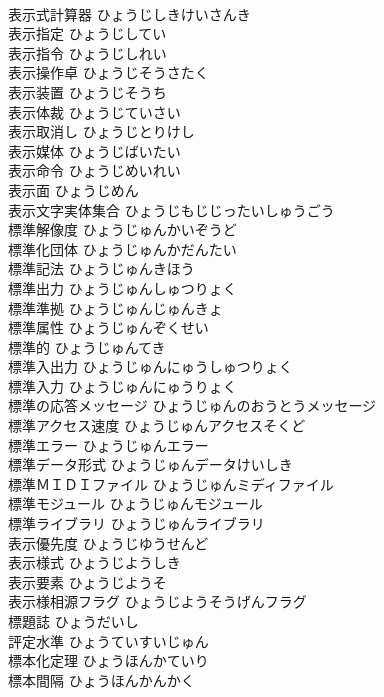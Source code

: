 \documentclass[8pt]{extreport}
\begin{document}
\begin{CJK}{UTF8}{min}
\\	表示式計算器	ひょうじしきけいさんき	
\\	表示指定	ひょうじしてい	
\\	表示指令	ひょうじしれい	
\\	表示操作卓	ひょうじそうさたく	
\\	表示装置	ひょうじそうち	
\\	表示体裁	ひょうじていさい	
\\	表示取消し	ひょうじとりけし	
\\	表示媒体	ひょうじばいたい	
\\	表示命令	ひょうじめいれい	
\\	表示面	ひょうじめん	
\\	表示文字実体集合	ひょうじもじじったいしゅうごう	
\\	標準解像度	ひょうじゅんかいぞうど	
\\	標準化団体	ひょうじゅんかだんたい	
\\	標準記法	ひょうじゅんきほう	
\\	標準出力	ひょうじゅんしゅつりょく	
\\	標準準拠	ひょうじゅんじゅんきょ	
\\	標準属性	ひょうじゅんぞくせい	
\\	標準的	ひょうじゅんてき	
\\	標準入出力	ひょうじゅんにゅうしゅつりょく	
\\	標準入力	ひょうじゅんにゅうりょく	
\\	標準の応答メッセージ	ひょうじゅんのおうとうメッセージ	
\\	標準アクセス速度	ひょうじゅんアクセスそくど	
\\	標準エラー	ひょうじゅんエラー	
\\	標準データ形式	ひょうじゅんデータけいしき	
\\	標準ＭＩＤＩファイル	ひょうじゅんミディファイル	
\\	標準モジュール	ひょうじゅんモジュール	
\\	標準ライブラリ	ひょうじゅんライブラリ	
\\	表示優先度	ひょうじゆうせんど	
\\	表示様式	ひょうじようしき	
\\	表示要素	ひょうじようそ	
\\	表示様相源フラグ	ひょうじようそうげんフラグ	
\\	標題誌	ひょうだいし	
\\	評定水準	ひょうていすいじゅん	
\\	標本化定理	ひょうほんかていり	
\\	標本間隔	ひょうほんかんかく	

\end{CJK}
\end{document}
